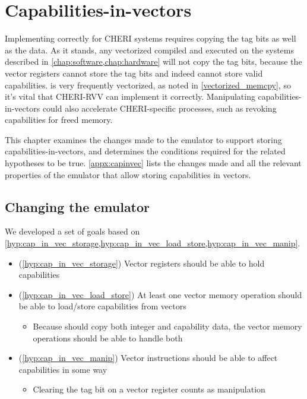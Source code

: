 \documentclass[../thesis]{subfiles}
\begin{document}
\chapter{Capabilities-in-vectors\label{chap:capinvec}}
Implementing  correctly for CHERI systems requires copying the tag bits as well as the data.
As it stands, any vectorized  compiled and executed on the systems described in \cref{chap:software,chap:hardware} will not copy the tag bits, because the vector registers cannot store the tag bits and indeed cannot store valid capabilities.
 is very frequently vectorized, as noted in \cref{vectorized_memcpy}, so it's vital that CHERI-RVV can implement it correctly.
Manipulating capabilities-in-vectors could also accelerate CHERI-specific processes, such as revoking capabilities for freed memory\cite{xiaCHERIvokeCharacterisingPointer2019}.

This chapter examines the changes made to the emulator to support storing capabilities-in-vectors, and determines the conditions required for the related hypotheses to be true.
\cref{appx:capinvec} lists the changes made and all the relevant properties of the emulator that allow storing capabilities in vectors.

\section{Changing the emulator}
We developed a set of goals based on \cref{hyp:cap_in_vec_storage,hyp:cap_in_vec_load_store,hyp:cap_in_vec_manip}.
\begin{itemize}
    \item (\cref{hyp:cap_in_vec_storage}) Vector registers should be able to hold capabilities 
    \item (\cref{hyp:cap_in_vec_load_store}) At least one vector memory operation should be able to load/store capabilities from vectors
    \begin{itemize}
        \item Because  should copy both integer and capability data, the vector memory operations should be able to handle both
    \end{itemize}
    \item (\cref{hyp:cap_in_vec_manip}) Vector instructions should be able to affect capabilities in some way
    \begin{itemize}
        \item Clearing the tag bit on a vector register counts as manipulation
    \end{itemize}
\end{itemize}
\end{document}
